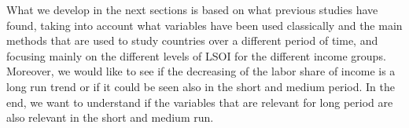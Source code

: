 \documentclass[12pt, letterpaper]{article}
\numberwithin{table}{section}   %
\begin{document}
What we develop in the next sections is based on what previous studies have found, taking into account what variables have been used classically and the main methods that are used to study countries over a different period of time, and focusing mainly on the different levels of LSOI for the different income groups. Moreover, we would like to see if the decreasing of the labor share of income is a long run trend or if it could be seen also in the short and medium period. In the end, we want to understand if the variables that are relevant for long period are also relevant in the short and medium run.

\end{document}
